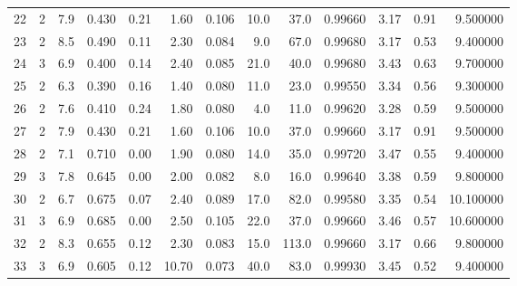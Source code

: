 \begin{tabular}{lrrrrrrrrrrrr}
22   &        2 &            7.9 &             0.430 &         0.21 &            1.60 &      0.106 &                 10.0 &                  37.0 &  0.99660 &  3.17 &       0.91 &   9.500000 \\
23   &        2 &            8.5 &             0.490 &         0.11 &            2.30 &      0.084 &                  9.0 &                  67.0 &  0.99680 &  3.17 &       0.53 &   9.400000 \\
24   &        3 &            6.9 &             0.400 &         0.14 &            2.40 &      0.085 &                 21.0 &                  40.0 &  0.99680 &  3.43 &       0.63 &   9.700000 \\
25   &        2 &            6.3 &             0.390 &         0.16 &            1.40 &      0.080 &                 11.0 &                  23.0 &  0.99550 &  3.34 &       0.56 &   9.300000 \\
26   &        2 &            7.6 &             0.410 &         0.24 &            1.80 &      0.080 &                  4.0 &                  11.0 &  0.99620 &  3.28 &       0.59 &   9.500000 \\
27   &        2 &            7.9 &             0.430 &         0.21 &            1.60 &      0.106 &                 10.0 &                  37.0 &  0.99660 &  3.17 &       0.91 &   9.500000 \\
28   &        2 &            7.1 &             0.710 &         0.00 &            1.90 &      0.080 &                 14.0 &                  35.0 &  0.99720 &  3.47 &       0.55 &   9.400000 \\
29   &        3 &            7.8 &             0.645 &         0.00 &            2.00 &      0.082 &                  8.0 &                  16.0 &  0.99640 &  3.38 &       0.59 &   9.800000 \\
30   &        2 &            6.7 &             0.675 &         0.07 &            2.40 &      0.089 &                 17.0 &                  82.0 &  0.99580 &  3.35 &       0.54 &  10.100000 \\
31   &        3 &            6.9 &             0.685 &         0.00 &            2.50 &      0.105 &                 22.0 &                  37.0 &  0.99660 &  3.46 &       0.57 &  10.600000 \\
32   &        2 &            8.3 &             0.655 &         0.12 &            2.30 &      0.083 &                 15.0 &                 113.0 &  0.99660 &  3.17 &       0.66 &   9.800000 \\
33   &        3 &            6.9 &             0.605 &         0.12 &           10.70 &      0.073 &                 40.0 &                  83.0 &  0.99930 &  3.45 &       0.52 &   9.400000 \\

\end{tabular}
